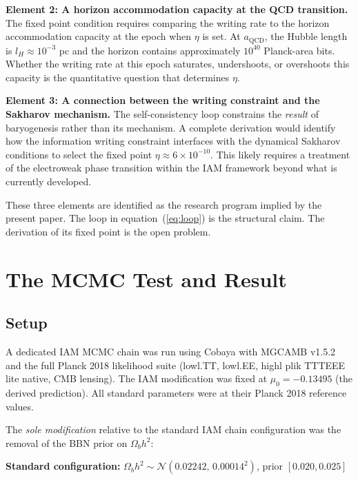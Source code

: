 \documentclass[12pt,a4paper]{article}
\begin{document}
\textbf{Element 2: A horizon accommodation capacity at the QCD transition.}
The fixed point condition requires comparing the writing rate to the
horizon accommodation capacity at the epoch when $\eta$ is set. At
$a_\mathrm{QCD}$, the Hubble length is $l_H \approx 10^{-3}$ pc and
the horizon contains approximately $10^{40}$ Planck-area bits. Whether
the writing rate at this epoch saturates, undershoots, or overshoots
this capacity is the quantitative question that determines $\eta$.

\textbf{Element 3: A connection between the writing constraint and the
Sakharov mechanism.} The self-consistency loop constrains the
\textit{result} of baryogenesis rather than its mechanism. A complete
derivation would identify how the information writing constraint
interfaces with the dynamical Sakharov conditions to select the fixed
point $\eta \approx 6 \times 10^{-10}$. This likely requires a
treatment of the electroweak phase transition within the IAM framework
beyond what is currently developed.

These three elements are identified as the research program implied by
the present paper. The loop in equation~(\ref{eq:loop}) is the
structural claim. The derivation of its fixed point is the open problem.

\section{The MCMC Test and Result}
\label{sec:falsification}

\subsection{Setup}

A dedicated IAM MCMC chain was run using Cobaya \citep{torrado2021}
with MGCAMB v1.5.2 \citep{wang2023} and the full Planck 2018 likelihood
suite \citep{planck2020} (lowl.TT, lowl.EE, highl plik TTTEEE lite
native, CMB lensing). The IAM modification was fixed at $\mu_0 =
-0.13495$ (the derived prediction). All standard parameters were at
their Planck 2018 reference values.

The \emph{sole modification} relative to the standard IAM chain
configuration was the removal of the BBN prior on $\Omega_b h^2$:

\textbf{Standard configuration:}
$\Omega_b h^2 \sim \mathcal{N}(0.02242,\, 0.00014^2)$, prior $[0.020, 0.025]$
\end{document}
